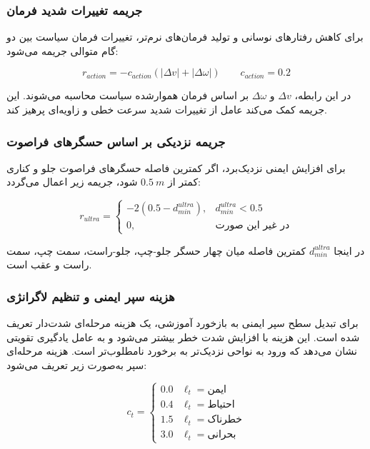 \subsubsection{جریمه تغییرات شدید فرمان}
\label{subsubsec:action_smooth_reward_final}

برای کاهش رفتارهای نوسانی و تولید فرمان‌های نرم‌تر، تغییرات فرمان سیاست بین دو گام متوالی جریمه می‌شود:

\begin{equation}
	r_{action} = -c_{action}\left(|\Delta v|+|\Delta\omega|\right)
	\qquad
	c_{action}=0.2
	\label{eq:action_change_penalty_final}
\end{equation}

در این رابطه، \(\Delta v\) و \(\Delta\omega\) بر اساس فرمان هموارشده سیاست محاسبه می‌شوند. این جریمه کمک می‌کند عامل از تغییرات شدید سرعت خطی و زاویه‌ای پرهیز کند.

\subsubsection{جریمه نزدیکی بر اساس حسگرهای فراصوت}
\label{subsubsec:ultrasonic_reward_final}

برای افزایش ایمنی نزدیک‌برد، اگر کمترین فاصله حسگرهای فراصوت جلو و کناری کمتر از \(0.5~m\) شود، جریمه زیر اعمال می‌گردد:

\begin{equation}
	r_{ultra}=
	\begin{cases}
		-2(0.5-d_{min}^{ultra}), & d_{min}^{ultra}<0.5\\
		0, & \text{در غیر این صورت}
	\end{cases}
	\label{eq:ultra_reward_final}
\end{equation}

در اینجا \(d_{min}^{ultra}\) کمترین فاصله میان چهار حسگر جلو-چپ، جلو-راست، سمت چپ، سمت راست و عقب است.
\subsubsection{هزینه سپر ایمنی و تنظیم لاگرانژی}
\label{subsubsec:shield_lagrangian_reward_final}

برای تبدیل سطح سپر ایمنی به بازخورد آموزشی، یک هزینه مرحله‌ای شدت‌دار تعریف شده است. این هزینه با افزایش شدت خطر بیشتر می‌شود و به عامل یادگیری تقویتی نشان می‌دهد که ورود به نواحی نزدیک‌تر به برخورد نامطلوب‌تر است. هزینه مرحله‌ای سپر به‌صورت زیر تعریف می‌شود:

\begin{equation}
	c_t =
	\begin{cases}
		0.0 & \ell_t=\text{ایمن}\\
		0.4 & \ell_t=\text{احتیاط}\\
		1.5 & \ell_t=\text{خطرناک}\\
		3.0 & \ell_t=\text{بحرانی}
	\end{cases}
	\label{eq:shield_step_cost_final}
\end{equation}

